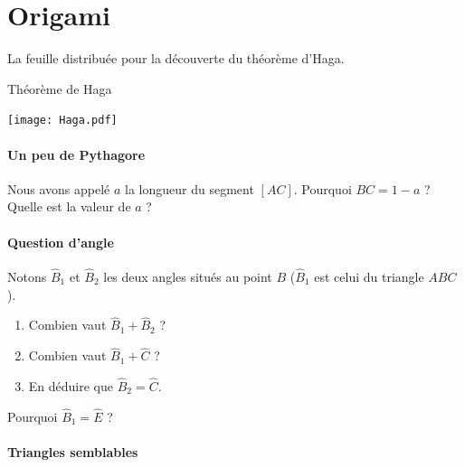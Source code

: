 
\section{Origami}

La feuille distribuée pour la découverte du théorème d'Haga.

\begin{feuilleExo}{Théorème de Haga}

    \begin{center}
\texttt{[image: Haga.pdf]}
    \end{center}

\paragraph{Un peu de Pythagore}


Nous avons appelé \( a\) la longueur du segment \( [AC]\). Pourquoi \( BC=1-a\) ? Quelle est la valeur de \( a\) ?

\paragraph{Question d'angle}

Notons \( \hat B_1\) et \( \hat B_2\) les deux angles situés au point \( B\) (\( \hat B_1\) est celui du triangle \( ABC\)).
\begin{enumerate}
    \item
        Combien vaut \( \hat B_1+\hat B_2\) ?
    \item
        Combien vaut \( \hat B_1+\hat C\) ?
    \item
        En déduire que \( \hat B_2=\hat C\).
\end{enumerate}
Pourquoi \( \hat B_1=\hat E\) ?

\paragraph{Triangles semblables}


\end{feuilleExo}
